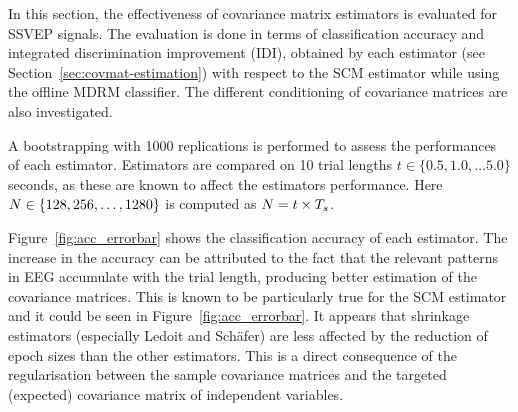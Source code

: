 In this section, the effectiveness of covariance matrix estimators is evaluated for SSVEP signals. 
The evaluation is done in terms of classification accuracy
 and integrated discrimination improvement (IDI), obtained by each estimator (see Section~\ref{sec:covmat-estimation}) with respect to the SCM estimator while using the offline MDRM classifier. 
The different conditioning of covariance matrices are also investigated.

A bootstrapping with 1000 replications is performed to assess the performances of each estimator. 
Estimators are compared on 10 trial lengths $t \in \{ 0.5, 1.0, \dots 5.0\}$ seconds, as these are known to affect the estimators performance. Here $N \in \{ 128, 256, \dots, 1280 \}$ is computed as $N=t \times T_s$.

Figure~\ref{fig:acc_errorbar} shows the classification accuracy of each estimator. 
The increase in the accuracy can be attributed to the fact that the relevant patterns in EEG accumulate with the trial length, producing better estimation of the covariance matrices. 
This is known to be particularly true for the SCM estimator and it could be seen in Figure~\ref{fig:acc_errorbar}.
It appears that shrinkage estimators (especially Ledoit and Sch\"afer) are less affected by the reduction of epoch sizes than the other estimators. This is a direct consequence of the regularisation between the sample covariance matrices and the targeted (expected) covariance matrix of independent variables.  

